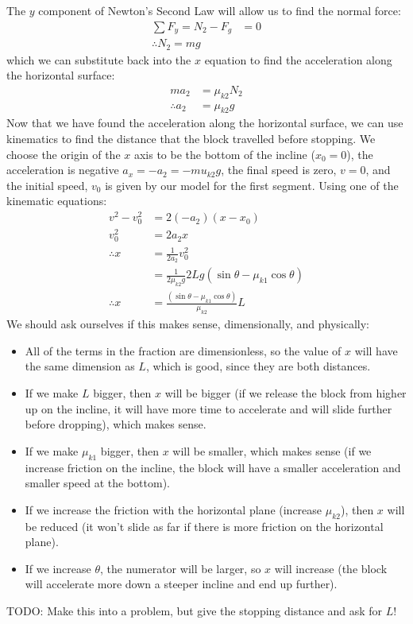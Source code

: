 \begin{example}
The $y$ component of Newton's Second Law will allow us to find the normal force:
\begin{align*}
\sum F_y = N_2 -F_g &=0\\
\therefore N_2 = mg
\end{align*}
which we can substitute back into the $x$ equation to find the acceleration along the horizontal surface:
\begin{align*}
ma_2 &=\mu_{k2}N_2 \\
\therefore a_2&=\mu_{k2}g
\end{align*}
Now that we have found the acceleration along the horizontal surface, we can use kinematics to find the distance that the block travelled before stopping. We choose the origin of the $x$ axis to be the bottom of the incline ($x_0=0$), the acceleration is negative $a_x = -a_2 = -mu_{k2}g$, the final speed is zero, $v=0$, and the initial speed, $v_0$ is given by our model for the first segment. Using one of the kinematic equations:
\begin{align*}
v^2-v_0^2&=2(-a_2)(x-x_0)\\
v_0^2&=2a_2x\\
\therefore x &=\frac{1}{2a_2}v_0^2\\
&=\frac{1}{2\mu_{k2}g}2Lg(\sin\theta-\mu_{k1}\cos\theta)\\
\therefore x&=\frac{(\sin\theta-\mu_{k1}\cos\theta)}{\mu_{k2}}L
\end{align*}
We should ask ourselves if this makes sense, dimensionally, and physically:
\begin{itemize}
\item All of the terms in the fraction are dimensionless, so the value of $x$ will have the same dimension as $L$, which is good, since they are both distances. 
\item If we make $L$ bigger, then $x$ will be bigger (if we release the block from higher up on the incline, it will have more time to accelerate and will slide further before dropping), which makes sense.
\item If we make $\mu_{k1}$ bigger, then $x$ will be smaller, which makes sense (if we increase friction on the incline, the block will have a smaller acceleration and smaller speed at the bottom).
\item If we increase the friction with the horizontal plane (increase $\mu_{k2}$), then $x$ will be reduced (it won't slide as far if there is more friction on the horizontal plane).
\item If we increase $\theta$, the numerator will be larger, so $x$ will increase (the block will accelerate more down a steeper incline and end up further).
\end{itemize} 

TODO: Make this into a problem, but give the stopping distance and ask for $L$!

\end{example}


